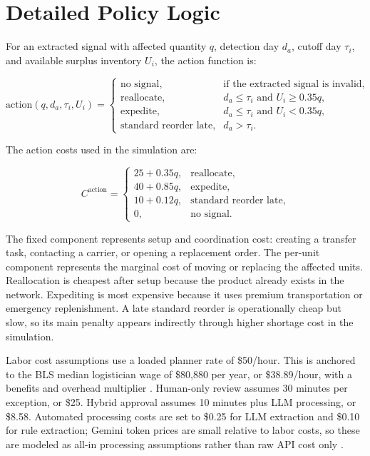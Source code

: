 \documentclass[11pt]{article}
\begin{document}
\clearpage



\clearpage
\appendix
\section{Detailed Policy Logic}
\label{app:policy}

For an extracted signal with affected quantity $q$, detection day $d_a$, cutoff day $\tau_i$, and available surplus inventory $U_i$, the action function is:

\[
\text{action}(q,d_a,\tau_i,U_i)=
\begin{cases}
\text{no signal}, & \text{if the extracted signal is invalid},\\
\text{reallocate}, & d_a \le \tau_i \text{ and } U_i\ge 0.35q,\\
\text{expedite}, & d_a \le \tau_i \text{ and } U_i<0.35q,\\
\text{standard reorder late}, & d_a > \tau_i.
\end{cases}
\]

The action costs used in the simulation are:

\[
C^{\text{action}} =
\begin{cases}
25+0.35q, & \text{reallocate},\\
40+0.85q, & \text{expedite},\\
10+0.12q, & \text{standard reorder late},\\
0, & \text{no signal}.
\end{cases}
\]

The fixed component represents setup and coordination cost: creating a transfer task, contacting a carrier, or opening a replacement order. The per-unit component represents the marginal cost of moving or replacing the affected units. Reallocation is cheapest after setup because the product already exists in the network. Expediting is most expensive because it uses premium transportation or emergency replenishment. A late standard reorder is operationally cheap but slow, so its main penalty appears indirectly through higher shortage cost in the simulation.

Labor cost assumptions use a loaded planner rate of \$50/hour. This is anchored to the BLS median logistician wage of \$80,880 per year, or \$38.89/hour, with a benefits and overhead multiplier \citep{bls2025logisticians}. Human-only review assumes 30 minutes per exception, or \$25. Hybrid approval assumes 10 minutes plus LLM processing, or \$8.58. Automated processing costs are set to \$0.25 for LLM extraction and \$0.10 for rule extraction; Gemini token prices are small relative to labor costs, so these are modeled as all-in processing assumptions rather than raw API cost only \citep{google2026pricing}.
\end{document}
